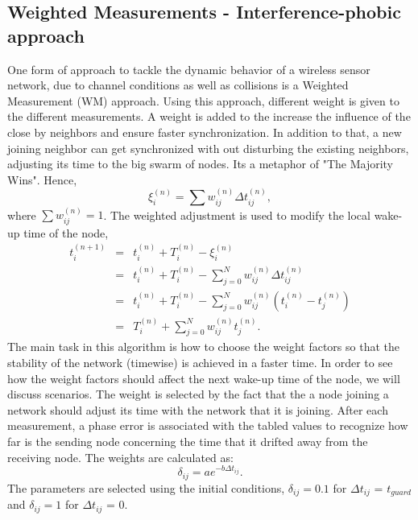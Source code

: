 \documentclass[a4paper,10pt]{report}
\begin{document}
\subsection{\textbf{Weighted Measurements - Interference-phobic approach}}
One form of approach to tackle the dynamic behavior of a wireless
sensor network, due to channel conditions as well as collisions is a
Weighted Measurement (WM) approach. Using this approach, different
weight is given to the different measurements. A weight is added to
the increase the influence of the close by neighbors and ensure
faster synchronization. In addition to that, a new joining neighbor
can get synchronized with out disturbing the existing neighbors,
adjusting its time to the big swarm of nodes. Its a metaphor of "The
Majority Wins". Hence,
\begin{equation}
\xi_i^{(n)} = \sum{w_{ij}^{(n)}\Delta t_{ij}^{(n)}} ,
\end{equation}
where $\sum{w_{ij}^{(n)}= 1}$.
\newline
The weighted adjustment is used to modify the local wake-up time of
the node,
\begin{eqnarray*}
t_i^{(n+1)} &=& t_i^{(n)} + T_i^{(n)} - \xi_i^{(n)} \\ &=& t_i^{(n)}
+ T_i^{(n)} - \sum_{j=0}^N{w_{ij}^{(n)}\Delta t_{ij}^{(n)}} \\ &=&
t_i^{(n)}+ T_i^{(n)} -
\sum_{j=0}^N{w_{ij}^{(n)}(t_i^{(n)}-t_j^{(n)})} \\ &=& T_i^{(n)} + \sum_{j=0}^N{w_{ij}^{(n)}t_j^{(n)}}.
\end{eqnarray*}
\newline
The main task in this algorithm is how to choose the weight factors so that the
stability of the network (timewise) is achieved in a faster time. In
order to see how the weight factors should affect the next wake-up
time of the node, we will discuss scenarios.
\newline
The weight is selected by the fact that the a node joining a network
should adjust its time with the network that it is joining. After
each measurement, a phase error is associated with the tabled values
to recognize how far is the sending node concerning the time that it
drifted away from the receiving node. The weights are calculated as:
\begin{equation}
\delta_{ij} = ae^{-b\Delta t_{ij}}.
\end{equation}
The parameters are selected using the initial conditions, $\delta_{ij}=0.1$ for $\Delta t_{ij}$ = $t_{guard}$ and $\delta_{ij}=1$ for $\Delta t_{ij}$ = 0.
\end{document}
